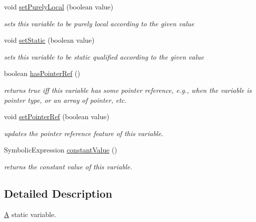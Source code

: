 \begin{DoxyCompactItemize}
void \hyperlink{interfaceedu_1_1udel_1_1cis_1_1vsl_1_1civl_1_1model_1_1IF_1_1variable_1_1Variable_a803def53493060cb98ebdb3b0d7f563a}{set\+Purely\+Local} (boolean value)
\begin{DoxyCompactList}\small\item\em sets this variable to be purely local according to the given value \end{DoxyCompactList}\item 
void \hyperlink{interfaceedu_1_1udel_1_1cis_1_1vsl_1_1civl_1_1model_1_1IF_1_1variable_1_1Variable_a49a7872ce0cd00a500614dc789d2bf5e}{set\+Static} (boolean value)
\begin{DoxyCompactList}\small\item\em sets this variable to be static qualified according to the given value \end{DoxyCompactList}\item 
boolean \hyperlink{interfaceedu_1_1udel_1_1cis_1_1vsl_1_1civl_1_1model_1_1IF_1_1variable_1_1Variable_a1474ebf3da47fd4418cd8e29d34d1973}{has\+Pointer\+Ref} ()
\begin{DoxyCompactList}\small\item\em returns true iff this variable has some pointer reference, e.\+g., when the variable is pointer type, or an array of pointer, etc. \end{DoxyCompactList}\item 
void \hyperlink{interfaceedu_1_1udel_1_1cis_1_1vsl_1_1civl_1_1model_1_1IF_1_1variable_1_1Variable_a02a798366ecc4098ec6a4aef6e26ea39}{set\+Pointer\+Ref} (boolean value)
\begin{DoxyCompactList}\small\item\em updates the pointer reference feature of this variable. \end{DoxyCompactList}\item 
Symbolic\+Expression \hyperlink{interfaceedu_1_1udel_1_1cis_1_1vsl_1_1civl_1_1model_1_1IF_1_1variable_1_1Variable_a156f69bb1ba91840e198c2e0d6728b24}{constant\+Value} ()
\begin{DoxyCompactList}\small\item\em returns the constant value of this variable. \end{DoxyCompactList}\end{DoxyCompactItemize}


\subsection{Detailed Description}
\hyperlink{structA}{A} static variable. 

